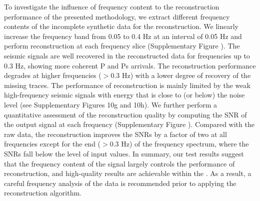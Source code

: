 To investigate the influence of frequency content to the reconstruction performance of the presented methodology, we extract different frequency contents of the incomplete synthetic data for the reconstruction.  We linearly increase the frequency band from 0.05 to 0.4 Hz at an interval of 0.05 Hz and perform reconstruction at each frequency slice (Supplementary Figure \color{blue}{10}\color{black}{}). The seismic signals are well recovered in the reconstructed data for frequencies up to 0.3 Hz, showing more coherent P and Ps arrivals. The reconstruction performance degrades at higher frequencies ($>$0.3 Hz) with a lower degree of recovery of the missing traces.  The performance of reconstruction is mainly limited by the weak high-frequency seismic signals with energy that is close to (or below) the noise level (see Supplementary Figures 10g and 10h). We further perform a quantitative assessment of the reconstruction quality by computing the SNR of the output signal at each frequency (Supplementary Figure \color{blue}{11}\color{black}{}). Compared with the raw data, the reconstruction improves the SNRs by a factor of two at all frequencies except for the  end ($>$0.3 Hz) of the frequency spectrum, where the SNRs fall below the level of input values. In summary, our test results suggest that the frequency content of the signal largely controls the performance of reconstruction, and high-quality results are achievable within the .  As a result, a careful frequency analysis of the data is recommended prior to applying the reconstruction algorithm.


